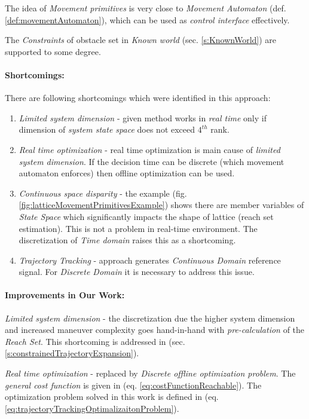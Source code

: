 The idea of \emph{Movement primitives} is very close to \emph{Movement Automaton} (def. \ref{def:movementAutomaton}), which can be used as \emph{control interface} effectively. 

The \emph{Constraints} of obstacle set in \emph{Known world} (sec. \ref{s:KnownWorld}) are supported to some degree.

\paragraph{Shortcomings:} There are following shortcomings which were identified in this approach:
\begin{enumerate}
    \item \emph{Limited system dimension} - given method works in \emph{real time} only if dimension of \emph{system state space} does not exceed $4^{th}$  rank.
    
    \item \emph{Real time optimization} - real time optimization is main cause of \emph{limited system dimension}. If the decision time can be discrete (which movement automaton enforces) then offline optimization  can be used. 
    
    \item \emph{Continuous space disparity} - the example (fig. \ref{fig:latticeMovementPrimitivesExample}) shows there are member variables of \emph{State Space} which significantly impacts the shape of lattice (reach set estimation). This is not a problem in real-time environment. The discretization of \emph{Time domain} raises this as a shortcoming.
    
    \item \emph{Trajectory Tracking} - approach generates \emph{Continuous Domain} reference signal. For \emph{Discrete Domain} it is necessary to address this issue.
\end{enumerate}

\paragraph{Improvements in Our Work:}

\emph{Limited system dimension} - the discretization due the higher system dimension and  increased maneuver complexity goes hand-in-hand with \emph{pre-calculation} of the \emph{Reach Set}. This shortcoming is addressed in (sec. \ref{s:constrainedTrajectoryExpansion}).

\emph{Real time optimization} -  replaced by \emph{Discrete offline optimization problem}. The \emph{general cost function} is given in (eq. \ref{eq:costFunctionReachable}). The optimization problem solved in this work is defined in (eq. \ref{eq:trajectoryTrackingOptimalizaitonProblem}).

